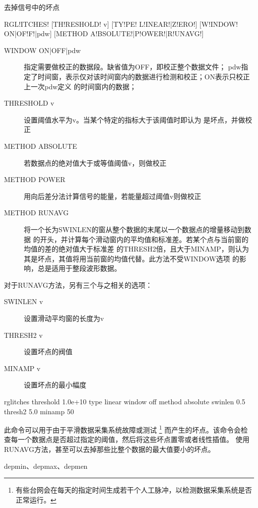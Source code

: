 \label{cmd:rglitches}

去掉信号中的坏点

\begin{SACSTX}
RGL!ITCHES! [TH!RESHOLD! v] [TY!PE! L!INEAR!|Z!ERO!] [W!INDOW! ON|OF!F!|pdw]
    [METHOD A!BSOLUTE!|P!OWER!|R!UNAVG!]
\end{SACSTX}

\begin{description}
\item [WINDOW ON|OFF|pdw] 指定需要做校正的数据段。缺省值为OFF，即校正整个数据文件；
    pdw指定了时间窗，表示仅对该时间窗内的数据进行检测和校正；ON表示只校正上一次pdw定义
    的时间窗内的数据；
\item [THRESHOLD v] 设置阈值水平为v。当某个特定的指标大于该阈值时即认为
    是坏点，并做校正
\item [METHOD ABSOLUTE] 若数据点的绝对值大于或等值阈值v，则做校正
\item [METHOD POWER] 用向后差分法计算信号的能量，若能量超过阈值v则做校正
\item [METHOD RUNAVG] 将一个长为SWINLEN的窗从整个数据的末尾以一个数据点的增量移动到数据
    的开头，并计算每个滑动窗内的平均值和标准差。若某个点与当前窗的均值的差的绝对值大于标准差
    的THRESH2倍，且大于MINAMP，则认为其是坏点，其值将用当前窗的均值代替。此方法不受WINDOW选项
    的影响，总是适用于整段波形数据。
\end{description}

对于RUNAVG方法，另有三个与之相关的选项：
\begin{description}
\item [SWINLEN v] 设置滑动平均窗的长度为v
\item [THRESH2 v] 设置坏点的阀值
\item [MINAMP v] 设置坏点的最小幅度
\end{description}

\begin{SACDFT}
rglitches threshold 1.0e+10 type linear window off method absolute
    swinlen 0.5 thresh2 5.0 minamp 50
\end{SACDFT}

此命令可以用于由于平滑数据采集系统故障或测试
\footnote{有些台网会在每天的指定时间生成若干个人工脉冲，以检测数据采集系统是否正常运行。}
而产生的坏点。该命令会检查每一个数据点是否超过指定的阈值，然后将这些坏点置零或者线性插值。
使用RUNAVG方法，甚至可以去掉那些比整个数据的最大值要小的坏点。

depmin、depmax、depmen
